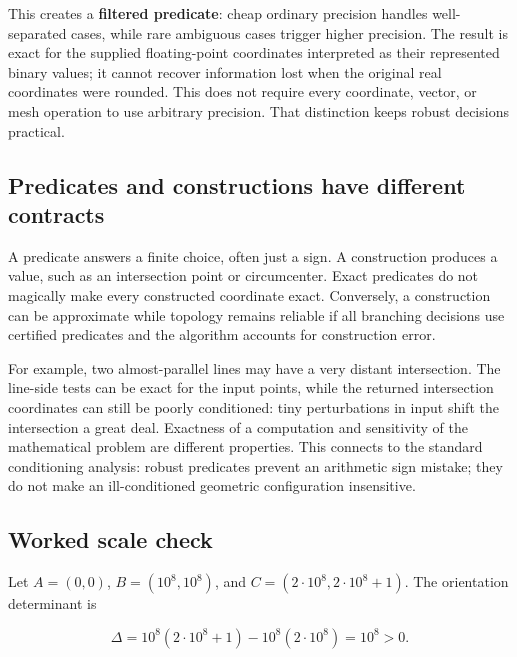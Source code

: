 This creates a \textbf{filtered predicate}: cheap ordinary precision handles well-separated cases, while rare ambiguous cases trigger higher precision. The result is exact for the supplied floating-point coordinates interpreted as their represented binary values; it cannot recover information lost when the original real coordinates were rounded. This does not require every coordinate, vector, or mesh operation to use arbitrary precision. That distinction keeps robust decisions practical.

\subsection{Predicates and constructions have different contracts}\label{02-foundations-ii-ch034-predicates-and-constructions-have-different-contracts}

\hypertarget{02-foundations-ii-ch034-predicates-and-constructions-have-different-contracts}{}

A predicate answers a finite choice, often just a sign. A construction produces a value, such as an intersection point or circumcenter. Exact predicates do not magically make every constructed coordinate exact. Conversely, a construction can be approximate while topology remains reliable if all branching decisions use certified predicates and the algorithm accounts for construction error.

For example, two almost-parallel lines may have a very distant intersection. The line-side tests can be exact for the input points, while the returned intersection coordinates can still be poorly conditioned: tiny perturbations in input shift the intersection a great deal. Exactness of a computation and sensitivity of the mathematical problem are different properties. This connects to the standard conditioning analysis: robust predicates prevent an arithmetic sign mistake; they do not make an ill-conditioned geometric configuration insensitive.

\subsection{Worked scale check}\label{02-foundations-ii-ch034-worked-scale-check}

\hypertarget{02-foundations-ii-ch034-worked-scale-check}{}

Let \(A=(0,0)\), \(B=(10^8,10^8)\), and \(C=(2\cdot10^8,2\cdot10^8+1)\). The orientation determinant is

\[
\Delta=10^8(2\cdot10^8+1)-10^8(2\cdot10^8)=10^8>0.
\]


